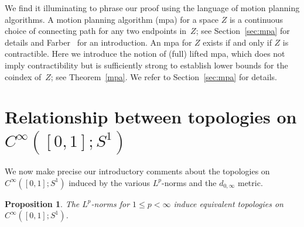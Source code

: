 \documentclass[11pt, reqno, english]{amsart}
\theoremstyle{plain}
\newtheorem{theorem}{Theorem}[section]
\newtheorem{proposition}[theorem]{Proposition}
\theoremstyle{definition}
\newcommand{\Z}{\mathbb{Z}}
\DeclareMathOperator{\coind}{\mathrm{coind}}
\begin{document}
We find it illuminating to phrase our proof using the language of motion planning algorithms. A motion planning algorithm (mpa) for a space $Z$ is a continuous choice of connecting path for any two endpoints in~$Z$; see Section~\ref{sec:mpa} for details and Farber~\cite{farber2003} for an introduction. An mpa for $Z$ exists if and only if $Z$ is contractible. Here we introduce the notion of (full) lifted mpa, which does not imply contractibility but is sufficiently strong to establish lower bounds for the coindex of~$Z$; see Theorem~\ref{mpa}. We refer to Section~\ref{sec:mpa} for details. %

% 















\section{Relationship between topologies on $C^{\infty}([0, 1]; S^{1})$}
\label{sec:topologies}

We now make precise our introductory comments about the topologies on
$C^{\infty}([0, 1]; S^{1})$ induced by the various $L^{p}$-norms and the $d_{0,
\infty}$ metric.

\begin{proposition}
  The $L^{p}$-norms for $1 \le p < \infty$ induce equivalent topologies on
  $C^{\infty}([0, 1]; S^{1})$.
\end{proposition}
\end{document}
